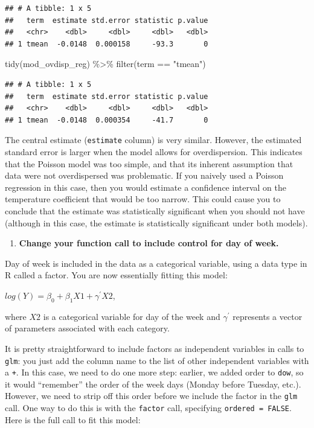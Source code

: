 \documentclass[
]{book}
\newenvironment{Shaded}{\begin{snugshade}}{\end{snugshade}}
\newcommand{\FunctionTok}[1]{\textcolor[rgb]{0.00,0.00,0.00}{#1}}
\newcommand{\NormalTok}[1]{#1}
\newcommand{\SpecialCharTok}[1]{\textcolor[rgb]{0.00,0.00,0.00}{#1}}
\newcommand{\StringTok}[1]{\textcolor[rgb]{0.31,0.60,0.02}{#1}}
\providecommand{\tightlist}{%
  \setlength{\itemsep}{0pt}\setlength{\parskip}{0pt}}
\begin{document}
\begin{verbatim}
## # A tibble: 1 x 5
##   term  estimate std.error statistic p.value
##   <chr>    <dbl>     <dbl>     <dbl>   <dbl>
## 1 tmean  -0.0148  0.000158     -93.3       0
\end{verbatim}

\begin{Shaded}
\begin{Highlighting}[]
\FunctionTok{tidy}\NormalTok{(mod\_ovdisp\_reg) }\SpecialCharTok{\%\textgreater{}\%} 
  \FunctionTok{filter}\NormalTok{(term }\SpecialCharTok{==} \StringTok{"tmean"}\NormalTok{)}
\end{Highlighting}
\end{Shaded}

\begin{verbatim}
## # A tibble: 1 x 5
##   term  estimate std.error statistic p.value
##   <chr>    <dbl>     <dbl>     <dbl>   <dbl>
## 1 tmean  -0.0148  0.000354     -41.7       0
\end{verbatim}

The central estimate (\texttt{estimate} column) is very similar. However, the estimated
standard error is larger when the model allows for overdispersion. This
indicates that the Poisson model was too simple, and that its inherent
assumption that data were not overdispersed was problematic. If you naively used
a Poisson regression in this case, then you would estimate a confidence
interval on the temperature coefficient that would be too narrow. This could
cause you to conclude that the estimate was statistically significant when
you should not have (although in this case, the estimate is statistically
significant under both models).

\begin{enumerate}
\def\labelenumi{\arabic{enumi}.}
\setcounter{enumi}{3}
\tightlist
\item
  \textbf{Change your function call to include control for day of week.}
\end{enumerate}

Day of week is included in the data as a categorical variable, using a
data type in R called a factor. You are now essentially fitting this model:

\(log(Y)=\beta_{0}+\beta_{1}X1+\gamma^{'}X2\),

where \(X2\) is a categorical variable for day of the week and \(\gamma^{'}\)
represents a vector of parameters associated with each category.

It is pretty straightforward to include factors as independent variables in calls
to \texttt{glm}: you just add the column name to the list of other independent variables
with a \texttt{+}. In this case, we need to do one more step: earlier, we added order to
\texttt{dow}, so it would ``remember'' the order of the week days (Monday before Tuesday,
etc.). However, we need to strip off this order before we include the factor in
the \texttt{glm} call. One way to do this is with the \texttt{factor} call, specifying
\texttt{ordered\ =\ FALSE}. Here is the full call to fit this model:
\end{document}

